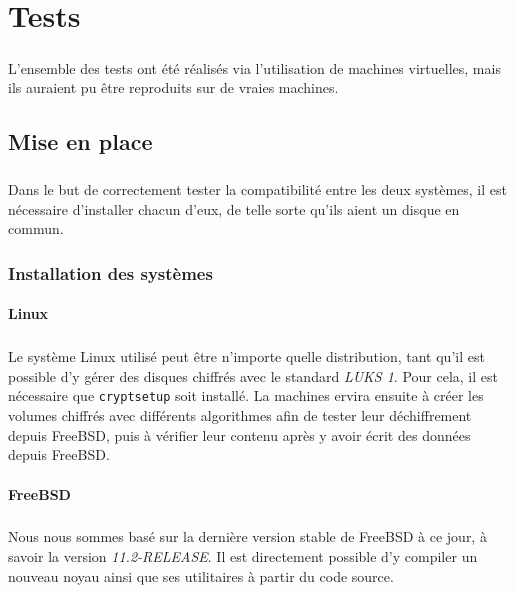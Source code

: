 \chapter{Tests}

\paragraph{}
L'ensemble des tests ont été réalisés via l'utilisation de machines virtuelles,
mais ils auraient pu être reproduits sur de vraies machines.

\section{Mise en place}

\paragraph{}
Dans le but de correctement tester la compatibilité entre les deux systèmes, il
est nécessaire d'installer chacun d'eux, de telle sorte qu'ils aient un disque
en commun.

\subsection{Installation des systèmes}
\subsubsection{Linux}
\paragraph{}
Le système Linux utilisé peut être n'importe quelle distribution, tant qu'il est
possible d'y gérer des disques chiffrés avec le standard \textit{LUKS 1}. Pour
cela, il est nécessaire que \texttt{cryptsetup} soit installé. La machines
ervira ensuite à créer les volumes chiffrés avec différents algorithmes afin de
tester leur déchiffrement depuis FreeBSD, puis à vérifier leur contenu après y
avoir écrit des données depuis FreeBSD.
\subsubsection{FreeBSD}
\paragraph{}
Nous nous sommes basé sur la dernière version stable de FreeBSD à ce jour, à
savoir la version \textit{11.2-RELEASE}. Il est directement possible d'y
compiler un nouveau noyau ainsi que ses utilitaires à partir du code source.
